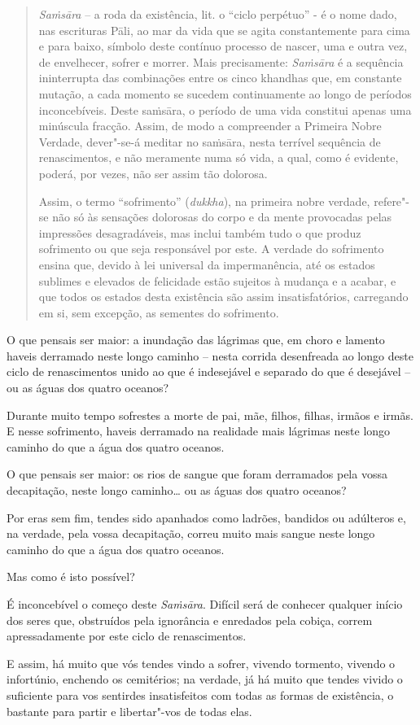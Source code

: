 \begin{quote}
  \emph{Sa\.{m}sāra} -- a roda da existência, lit. o ``ciclo perpétuo'' - é o
  nome dado, nas escrituras Pāli, ao mar da vida que se agita constantemente
  para cima e para baixo, símbolo deste contínuo processo de nascer, uma e outra
  vez, de envelhecer, sofrer e morrer. Mais precisamente: \emph{Sa\.{m}sāra} é a
  sequência ininterrupta das combinações entre os cinco khandhas que, em
  constante mutação, a cada momento se sucedem continuamente ao longo de
  períodos inconcebíveis. Deste saṁsāra, o período de uma vida constitui apenas
  uma minúscula fracção. Assim, de modo a compreender a Primeira Nobre Verdade,
  dever"-se-á meditar no saṁsāra, nesta terrível sequência de renascimentos, e
  não meramente numa só vida, a qual, como é evidente, poderá, por vezes, não
  ser assim tão dolorosa.

  Assim, o termo ``sofrimento'' (\emph{dukkha}), na primeira nobre verdade,
  refere"-se não só às sensações dolorosas do corpo e da mente provocadas pelas
  impressões desagradáveis, mas inclui também tudo o que produz sofrimento ou
  que seja responsável por este. A verdade do sofrimento ensina que, devido à
  lei universal da impermanência, até os estados sublimes e elevados de
  felicidade estão sujeitos à mudança e a acabar, e que todos os estados desta
  existência são assim insatisfatórios, carregando em si, sem excepção, as
  sementes do sofrimento.
\end{quote}

O que pensais ser maior: a inundação das lágrimas que, em choro e lamento haveis
derramado neste longo caminho -- nesta corrida desenfreada ao longo deste ciclo
de renascimentos unido ao que é indesejável e separado do que é desejável -- ou
as águas dos quatro oceanos?

Durante muito tempo sofrestes a morte de pai, mãe, filhos, filhas, irmãos e
irmãs. E nesse sofrimento, haveis derramado na realidade mais lágrimas neste
longo caminho do que a água dos quatro oceanos.

O que pensais ser maior: os rios de sangue que foram derramados pela vossa
decapitação, neste longo caminho\ldots{} ou as águas dos quatro oceanos?

Por eras sem fim, tendes sido apanhados como ladrões, bandidos ou adúlteros e,
na verdade, pela vossa decapitação, correu muito mais sangue neste longo caminho
do que a água dos quatro oceanos.

Mas como é isto possível?

É inconcebível o começo deste \emph{Saṁsāra}. Difícil será de conhecer qualquer
início dos seres que, obstruídos pela ignorância e enredados pela cobiça, correm
apressadamente por este ciclo de renascimentos.


E assim, há muito que vós tendes vindo a sofrer, vivendo tormento, vivendo o
infortúnio, enchendo os cemitérios; na verdade, já há muito que tendes vivido o
suficiente para vos sentirdes insatisfeitos com todas as formas de existência, o
bastante para partir e libertar"-vos de todas elas.

